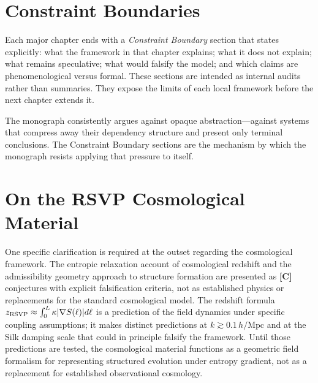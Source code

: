 \section*{Constraint Boundaries}

Each major chapter ends with a \emph{Constraint Boundary} section that states
explicitly: what the framework in that chapter explains; what it does not explain;
what remains speculative; what would falsify the model; and which claims are
phenomenological versus formal. These sections are intended as internal audits
rather than summaries. They expose the limits of each local framework before the
next chapter extends it.

The monograph consistently argues against opaque abstraction---against systems
that compress away their dependency structure and present only terminal conclusions.
The Constraint Boundary sections are the mechanism by which the monograph resists
applying that pressure to itself.

\section*{On the RSVP Cosmological Material}

One specific clarification is required at the outset regarding the \RSVP cosmological
framework. The entropic relaxation account of cosmological redshift and the
admissibility geometry approach to structure formation are presented as
\textbf{[C]} conjectures with explicit falsification criteria, not as established
physics or replacements for the standard cosmological model. The redshift formula
$z_{\rm RSVP} \approx \int_0^L \kappa |\nabla S(\ell)| d\ell$ is a prediction of
the \RSVP field dynamics under specific coupling assumptions; it makes distinct
predictions at $k \gtrsim 0.1\,h/\text{Mpc}$ and at the Silk damping scale that
could in principle falsify the framework. Until those predictions are tested, the
cosmological material functions as a geometric field formalism for representing
structured evolution under entropy gradient, not as a replacement for established
observational cosmology.

\cleardoublepage
